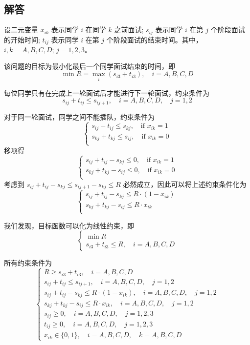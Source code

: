 \documentclass{article}
\begin{document}
\subsection*{{\heiti 解答}}

设二元变量 $x_{ik}$ 表示同学 $i$ 在同学 $k$ 之前面试; $s_{ij}$ 表示同学 $i$ 在第 $j$ 个阶段面试的开始时间; $t_{ij}$ 表示同学 $i$ 在第 $j$ 个阶段面试的结束时间。其中，$i,k = A, B, C, D$; $j = 1, 2, 3$。

该问题的目标为最小化最后一个同学面试结束的时间，即
$$
\min R = \max_i (s_{i3} + t_{i3}), \quad i = A, B, C, D
$$

每位同学只有在完成上一轮面试后才能进行下一轮面试，约束条件为
$$
s_{ij} + t_{ij} \leq s_{ij+1}, \quad i = A, B, C, D, \quad j = 1, 2
$$

对于同一轮面试，同学之间不能插队，约束条件为
$$
\begin{cases}
    s_{ij} + t_{ij} \leq s_{kj}, \quad \text{if } x_{ik} = 1 \\
    s_{kj} + t_{kj} \leq s_{ij}, \quad \text{if } x_{ik} = 0 \\
\end{cases}
$$
移项得
$$
\begin{cases}
    s_{ij} + t_{ij} - s_{kj} \leq 0, \quad \text{if } x_{ik} = 1 \\
    s_{kj} + t_{kj} - s_{ij} \leq 0, \quad \text{if } x_{ik} = 0 \\
\end{cases}
$$
考虑到 $s_{ij} + t_{ij} - s_{kj} \leq s_{ij+1} - s_{kj} \leq R$ 必然成立，因此可以将上述约束条件化为
$$
\begin{cases}
    s_{ij} + t_{ij} - s_{kj} \leq R \cdot (1 - x_{ik}) \\
    s_{kj} + t_{kj} - s_{ij} \leq R \cdot x_{ik} \\
\end{cases}
$$

我们发现，目标函数可以化为线性约束，即
$$
\begin{cases}
    \min R \\
    s_{i3} + t_{i3} \leq R, \quad i = A, B, C, D
\end{cases}
$$

所有约束条件为
$$
\begin{cases}
    R \geq s_{i3} + t_{i3}, \quad i = A, B, C, D \\
    s_{ij} + t_{ij} \leq s_{ij+1}, \quad i = A, B, C, D, \quad j = 1, 2 \\
    s_{ij} + t_{ij} - s_{kj} \leq R \cdot (1 - x_{ik}), \quad i = A, B, C, D, \quad j = 1, 2 \\
    s_{kj} + t_{kj} - s_{ij} \leq R \cdot x_{ik}, \quad i = A, B, C, D, \quad j = 1, 2 \\
    s_{ij} \geq 0, \quad i = A, B, C, D, \quad j = 1, 2, 3 \\
    t_{ij} \geq 0, \quad i = A, B, C, D, \quad j = 1, 2, 3 \\
    x_{ik} \in \{0, 1\}, \quad i = A, B, C, D, \quad k = A, B, C, D
\end{cases}
$$
\end{document}
